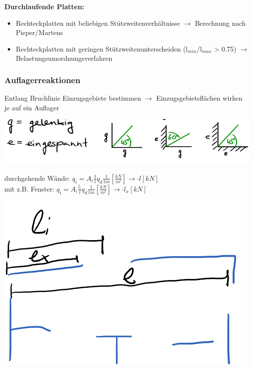 	\begin{minipage}{0.5\linewidth}
		

		
		\textbf{Durchlaufende Platten:}
			\begin{itemize}
						
				\item Rechteckplatten mit beliebigen Stützweitenverhältnisse $ \rightarrow $ Berechnung nach Pieper/Martens
				
				\item Rechteckplatten mit geringen Stützweitenunterscheiden (l$_{min}$/l$_{max}$ > 0.75) $ \rightarrow $ Belastungsumordnungsverfahren
				
			\end{itemize}
		
		\subsubsection{Auflagerreaktionen}
		
		Entlang Bruchlinie Einzugsgebiete bestimmen $ \rightarrow $ Einzugsgebietsflächen wirken je auf ein Auflager
		
		\includegraphics[width=\linewidth]{images/DW7Auflagerreaktion.PNG}
		
		
		durchgehende Wände: $ q_i = A_i \frac{1}{l} q_d \frac{1}{1m} [\frac{kN}{m^l} ] \rightarrow \cdot l [kN] $ \\
		
		mit z.B. Fenster: $ q_i = A_i \frac{l_i}{l} q_d \frac{1}{1m} [\frac{kN}{m^l} ]  \rightarrow \cdot l_x [kN] $
		
		
		\includegraphics[width=0.7\linewidth]{images/DW8Auflagerlange.PNG}
		
	\end{minipage}

